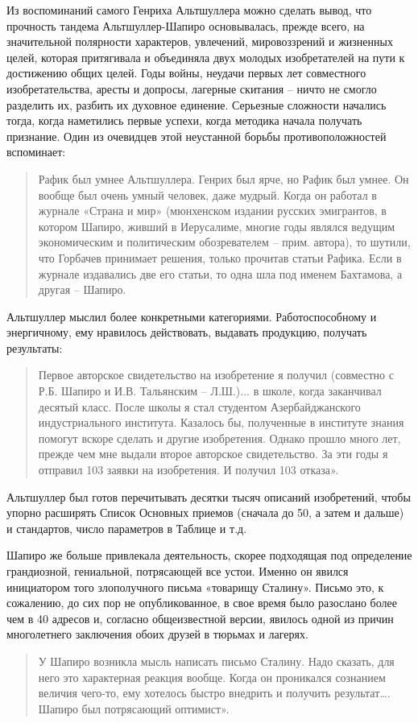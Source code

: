 \documentclass[11pt,a4paper]{article}
\begin{document}
Из воспоминаний самого Генриха Альтшуллера можно сделать вывод, что прочность
тандема Альтшуллер-Шапиро основывалась, прежде всего, на значительной
полярности характеров, увлечений, мировоззрений и жизненных целей, которая
притягивала и объединяла двух молодых изобретателей на пути к достижению общих
целей. Годы войны, неудачи первых лет совместного изобретательства, аресты и
допросы, лагерные скитания -- ничто не смогло разделить их, разбить их
духовное единение. Серьезные сложности начались тогда, когда наметились первые
успехи, когда методика начала получать признание. Один из очевидцев этой
неустанной борьбы противоположностей вспоминает: 
\begin{quote}
  Рафик был умнее Альтшуллера. Генрих был ярче, но Рафик был умнее. Он вообще
  был очень умный человек, даже мудрый. Когда он работал в журнале «Страна и
  мир» (мюнхенском издании русских эмигрантов, в котором Шапиро, живший в
  Иерусалиме, многие годы являлся ведущим экономическим и политическим
  обозревателем -- прим. автора), то шутили, что Горбачев принимает решения,
  только прочитав статьи Рафика. Если в журнале издавались две его статьи, то
  одна шла под именем Бахтамова, а другая -- Шапиро.
\end{quote}

Альтшуллер мыслил более конкретными категориями. Работоспособному и
энергичному, ему нравилось действовать, выдавать продукцию, получать
результаты: 
\begin{quote}
  Первое авторское свидетельство на изобретение я получил (совместно с
  Р.Б. Шапиро и И.В. Тальянским -- Л.Ш.)... в школе, когда заканчивал десятый
  класс. После школы я стал студентом Азербайджанского индустриального
  института.  Казалось бы, полученные в институте знания помогут вскоре
  сделать и другие изобретения. Однако прошло много лет, прежде чем мне выдали
  второе авторское свидетельство. За эти годы я отправил 103 заявки на
  изобретения. И получил 103 отказа». \cite{Altshuller1961}
\end{quote}
Альтшуллер был готов перечитывать десятки тысяч описаний изобретений, чтобы
упорно расширять Список Основных приемов (сначала до 50, а затем и дальше) и
стандартов, число параметров в Таблице и т.д.

Шапиро же больше привлекала деятельность, скорее подходящая под определение
грандиозной, гениальной, потрясающей все устои. Именно он явился инициатором
того злополучного письма «товарищу Сталину». Письмо это, к сожалению, до сих
пор не опубликованное, в свое время было разослано более чем в 40 адресов и,
согласно общеизвестной версии, явилось одной из причин многолетнего заключения
обоих друзей в тюрьмах и лагерях. 
\begin{quote}
  У Шапиро возникла мысль написать письмо Сталину. Надо сказать, для него это
  характерная реакция вообще. Когда он проникался сознанием величия чего-то,
  ему хотелось быстро внедрить и получить результат…. Шапиро был потрясающий
  оптимист». \cite{Altshuller1986}
\end{quote}
\end{document}
